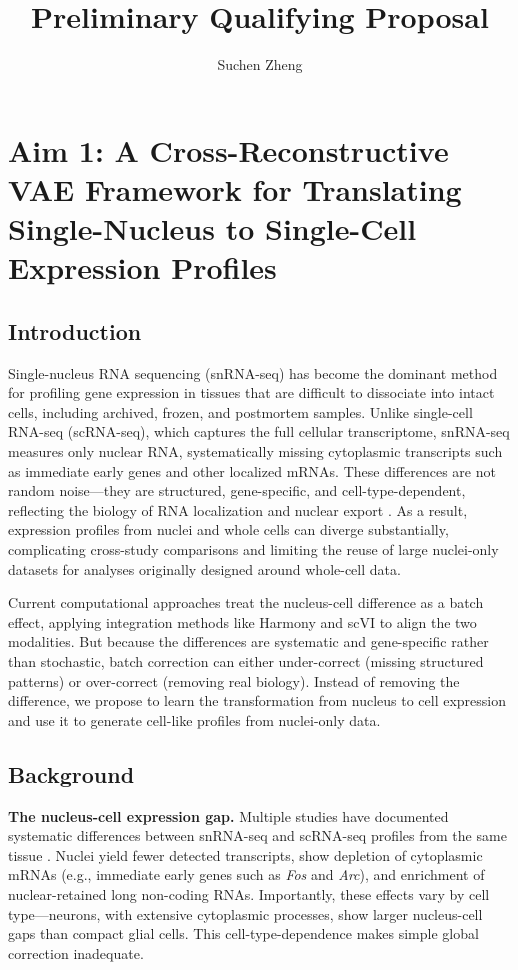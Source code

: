 \documentclass[11pt]{article}
\title{Preliminary Qualifying Proposal}
\author{Suchen Zheng}
\date{}
\begin{document}
\maketitle

\section*{Aim 1: A Cross-Reconstructive VAE Framework for Translating Single-Nucleus to Single-Cell Expression Profiles}

\subsection*{Introduction}

Single-nucleus RNA sequencing (snRNA-seq) has become the dominant method for profiling gene expression in tissues that are difficult to dissociate into intact cells, including archived, frozen, and postmortem samples. Unlike single-cell RNA-seq (scRNA-seq), which captures the full cellular transcriptome, snRNA-seq measures only nuclear RNA, systematically missing cytoplasmic transcripts such as immediate early genes and other localized mRNAs. These differences are not random noise---they are structured, gene-specific, and cell-type-dependent, reflecting the biology of RNA localization and nuclear export \citep{bakken2018single, ding2020systematic}. As a result, expression profiles from nuclei and whole cells can diverge substantially, complicating cross-study comparisons and limiting the reuse of large nuclei-only datasets for analyses originally designed around whole-cell data.

Current computational approaches treat the nucleus-cell difference as a batch effect, applying integration methods like Harmony \citep{korsunsky2019fast} and scVI \citep{lopez2018deep} to align the two modalities. But because the differences are systematic and gene-specific rather than stochastic, batch correction can either under-correct (missing structured patterns) or over-correct (removing real biology). Instead of removing the difference, we propose to learn the transformation from nucleus to cell expression and use it to generate cell-like profiles from nuclei-only data.

\subsection*{Background}

\textbf{The nucleus-cell expression gap.} Multiple studies have documented systematic differences between snRNA-seq and scRNA-seq profiles from the same tissue \citep{bakken2018single, ding2020systematic}. Nuclei yield fewer detected transcripts, show depletion of cytoplasmic mRNAs (e.g., immediate early genes such as \textit{Fos} and \textit{Arc}), and enrichment of nuclear-retained long non-coding RNAs. Importantly, these effects vary by cell type---neurons, with extensive cytoplasmic processes, show larger nucleus-cell gaps than compact glial cells. This cell-type-dependence makes simple global correction inadequate.
\end{document}
